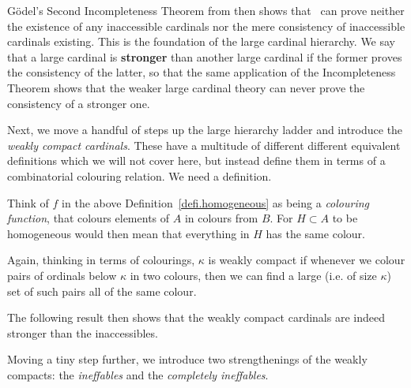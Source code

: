 \documentclass[../../main]{subfiles}
\begin{document}
G\"odel's Second Incompleteness Theorem from \cite{godel-incompleteness} then shows that \zfc\ can prove neither the existence of any inaccessible cardinals nor the mere consistency of inaccessible cardinals existing. This is the foundation of the large cardinal hierarchy. We say that a large cardinal is \textbf{stronger} than another large cardinal if the former proves the consistency of the latter, so that the same application of the Incompleteness Theorem shows that the weaker large cardinal theory can never prove the consistency of a stronger one.

\qquad Next, we move a handful of steps up the large hierarchy ladder and introduce the \textit{weakly compact cardinals}. These have a multitude of different different equivalent definitions which we will not cover here, but instead define them in terms of a combinatorial colouring relation. We need a definition.


Think of $f$ in the above Definition~\ref{defi.homogeneous} as being a \textit{colouring function}, that colours elements of $A$ in colours from $B$. For $H\subset A$ to be homogeneous would then mean that everything in $H$ has the same colour.


Again, thinking in terms of colourings, $\kappa$ is weakly compact if whenever we colour pairs of ordinals below $\kappa$ in two colours, then we can find a large (i.e. of size $\kappa$) set of such pairs all of the same colour.

\qquad The following result then shows that the weakly compact cardinals are indeed stronger than the inaccessibles.


Moving a tiny step further, we introduce two strengthenings of the weakly compacts: the \textit{ineffables} and the \textit{completely ineffables}.

\end{document}
